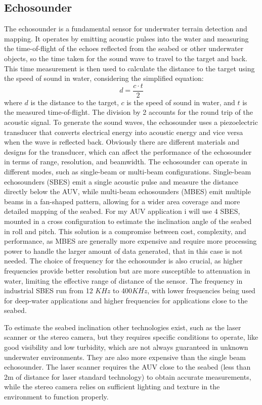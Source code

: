 \subsection{Echosounder}
The echosounder is a fundamental sensor for underwater terrain detection and mapping.
It operates by emitting acoustic pulses into the water and measuring the time-of-flight of the echoes reflected from the seabed or other underwater objects, so the time taken 
for the sound wave to travel to the target and back. This time measurement is then used to calculate the distance to the target using the speed of sound in water, considering the simplified equation:
\begin{equation}
    d = \frac{c \cdot t}{2}
    \label{eq:echosounder_simple}
\end{equation}
where $d$ is the distance to the target, $c$ is the speed of sound in water, and $t$ is the measured time-of-flight. The division by 2 accounts for the round trip of the acoustic signal.
To generate the sound waves, the echosounder uses a piezoelectric transducer that converts electrical energy into acoustic energy and vice versa when the wave is reflected back. Obviously there are 
different materials and designs for the transducer, which can affect the performance of the echosounder in terms of range, resolution, and beamwidth.
The echosounder can operate in different modes, such as single-beam or multi-beam configurations. Single-beam echosounders (SBES) emit a single acoustic pulse and measure the distance directly 
below the AUV, while multi-beam echosounders (MBES) emit multiple beams in a fan-shaped pattern, allowing for a wider area coverage and more detailed mapping of the seabed.
For my AUV application i will use $4$ SBES, mounted in a cross configuration to estimate the inclination angle of the seabed in roll and pitch. This solution is a compromise between
cost, complexity, and performance, as MBES are generally more expensive and require more processing power to handle the larger amount of data generated, that in this case is not needed.
The choice of frequency for the echosounder is also crucial, as higher frequencies provide better resolution but are more susceptible to attenuation in water, limiting the effective range 
of distance of the sensor. The frequency in industrial SBES run from 12 $KHz$ to 400$KHz$, with lower frequencies being used for deep-water applications and higher frequencies for applications 
close to the seabed.

To estimate the seabed inclination other technologies exist, such as the laser scanner or the stereo camera, but they requires specific conditions to operate, like good visibility and low 
turbidity, which are not always guaranteed in unknown underwater environments. They are also more expensive than the single beam echosounder.
The laser scanner requires the AUV close to the seabed (less than 2m of distance for laser standard technology) to obtain accurate measurements, while the stereo camera relies on sufficient 
lighting and texture in the environment to function properly.

